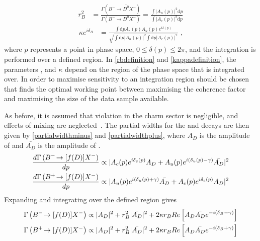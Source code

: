 \begin{align}
r_B^2 &= \frac{\Gamma(B^- \to \bar{D^0}X^-)}{\Gamma(B^- \to D^0X^-)} = \frac{\int \left|A_u(p)\right|^2 \mathrm{d}p}{\int \left|A_c(p)\right|^2 \mathrm{d}p}
\label{rbdefinition}
\end{align}
\begin{align}
\kappa e^{i\delta_B} &= \frac{\int \mathrm{d}p A_c(p)A_u(p)e^{i\delta(p)}}{\sqrt{\int \mathrm{d}p \left|A_u(p)\right|^2 \int \mathrm{d}p \left|A_c(p)\right|^2}} \text{ ,}
\label{kappadefinition}
\end{align}
where $p$ represents a point in phase space, $0 \leq \delta(p) \leq 2\pi$, and the integration is performed over a defined \Kstarm region. In \eqns\ref{rbdefinition} and \ref{kappadefinition}, the parameters \rb, \deltab and $\kappa$ depend on the region of the \decay{\Bm}{\D\KS\pim} phase space that is integrated over. In order to maximise sensitivity to \Pgamma an integration region should be chosen that finds the optimal working point between maximising the coherence factor and maximising the size of the data sample available.

As before, it is assumed that \CP violation in the charm sector is negligible, and effects of \D mixing are neglected~\cite{charmcpv,charmmixing}. The partial widths for the \Bm and \Bp decays are then given by \eqns\ref{partialwidthminus} and \ref{partialwidthplus}, where $A_D$ is the amplitude of  and $\bar{A_{D}}$ is the amplitude of .
\begin{align}
\frac{d\Gamma\left({{{B}^-}}\!\rightarrow [f(D)]X^-\right)}{dp} &\propto | A_c(p) e^{i\delta_c(p)}A_{D} + A_u(p) e^{i(\delta_u(p) - \gamma)}\bar{A_{D}} |^2 \label{partialwidthminus} \\
\frac{d\Gamma\left({{{B}^+}}\!\rightarrow [f(D)]X^-\right)}{dp} &\propto | A_u(p) e^{i(\delta_u(p) + \gamma)}\bar{A_{D}} + A_c(p) e^{i\delta_c(p)}A_{D} |^2 \label{partialwidthplus}
\end{align}
Expanding and integrating over the defined \Kstar region gives
\begin{align}
\Gamma\left({{{B}^-}}\!\rightarrow [f(D)]X^-\right) &\propto |A_D|^2 + r_B^2 |\bar{A_{D}}|^2 + 2\kappa r_B Re\left[ A_D \bar{A_{D}} e^{-i(\delta_B - \gamma)} \right] \label{BandDdecaysminus} \\
\Gamma\left({{{B}^+}}\!\rightarrow [f(D)]X^-\right) &\propto |A_D|^2 + r_B^2 |\bar{A_{D}}|^2 + 2\kappa r_B Re\left[ A_D \bar{A_{D}} e^{-i(\delta_B + \gamma)} \right] \label{BandDdecaysplus}
\end{align}

